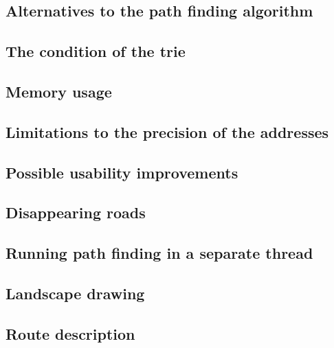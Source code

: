 \documentclass[a4paper,11pt]{article}
\begin{document}
\subsection{Alternatives to the path finding algorithm}


\subsection{The condition of the trie}


\subsection{Memory usage}


\subsection{Limitations to the precision of the addresses}


\subsection{Possible usability improvements}


\subsection{Disappearing roads}


\subsection{Running path finding in a separate thread}


\subsection{Landscape drawing}


\subsection{Route description}

\end{document}
